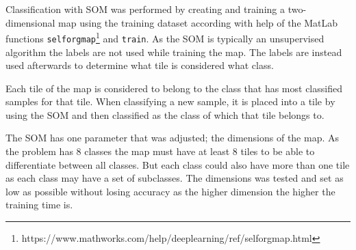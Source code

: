 \documentclass[doc/report.tex]{subfiles}
\begin{document}
Classification with SOM was performed by creating and training a
two-dimensional map using the training dataset according with help of the
MatLab functions
\texttt{selforgmap}\footnote{https://www.mathworks.com/help/deeplearning/ref/selforgmap.html}
and \texttt{train}. As the SOM is typically an unsupervised algorithm the
labels are not used while training the map. The labels are instead used
afterwards to determine what tile is considered what class.

Each tile of the map is considered to belong to the class that has most
classified samples for that tile. When classifying a new sample, it is placed
into a tile by using the SOM and then classified as the class of which that
tile belongs to.

The SOM has one parameter that was adjusted; the dimensions of the map. As the
problem has 8 classes the map must have at least 8 tiles to be able to
differentiate between all classes. But each class could also have more than one
tile as each class may have a set of subclasses. The dimensions was tested and
set as low as possible without losing accuracy as the higher dimension the
higher the training time is.
\end{document}

